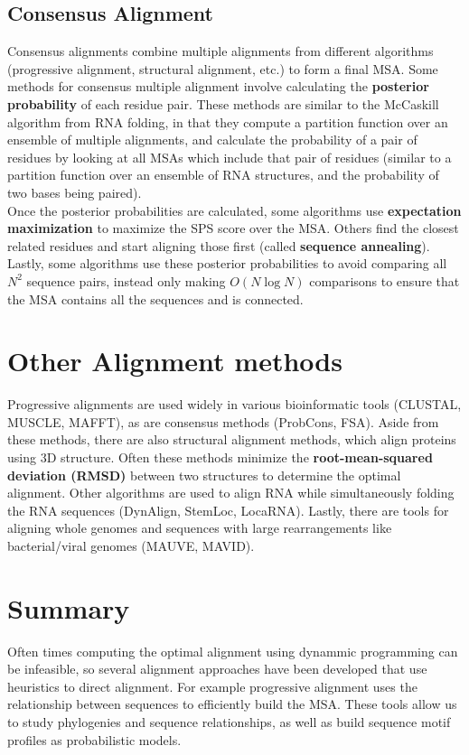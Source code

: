 \documentclass[12pt]{article}
\begin{document}
\subsection{Consensus Alignment}
Consensus alignments combine multiple alignments from different algorithms (progressive alignment, structural alignment, etc.) to form a final MSA. Some methods for consensus multiple alignment involve calculating the \textbf{posterior probability} of each residue pair. These methods are similar to the McCaskill algorithm from RNA folding, in that they compute a partition function over an ensemble of multiple alignments, and calculate the probability of a pair of residues by looking at all MSAs which include that pair of residues (similar to a partition function over an ensemble of RNA structures, and the probability of two bases being paired).\\[10pt]
Once the posterior probabilities are calculated, some algorithms use \textbf{expectation maximization} to maximize the SPS score over the MSA. Others find the closest related residues and start aligning those first (called \textbf{sequence annealing}). Lastly, some algorithms use these posterior probabilities to avoid comparing all $N^2$ sequence pairs, instead only making $O(N\log N)$ comparisons to ensure that the MSA contains all the sequences and is connected.


\section{Other Alignment methods}
Progressive alignments are used widely in various bioinformatic tools (CLUSTAL, MUSCLE, MAFFT), as are consensus methods (ProbCons, FSA). Aside from these methods, there are also structural alignment methods, which align proteins using 3D structure. Often these methods minimize the \textbf{root-mean-squared deviation (RMSD)} between two structures to determine the optimal alignment. Other algorithms are used to align RNA while simultaneously folding the RNA sequences (DynAlign, StemLoc, LocaRNA). Lastly, there are tools for aligning whole genomes and sequences with large rearrangements like bacterial/viral genomes (MAUVE, MAVID).

\section{Summary}
Often times computing the optimal alignment using dynammic programming can be infeasible, so several alignment approaches have been developed that use heuristics to direct alignment. For example progressive alignment uses the relationship between sequences to efficiently build the MSA. These tools allow us to study phylogenies and sequence relationships, as well as build sequence motif profiles as probabilistic models.
\end{document}
